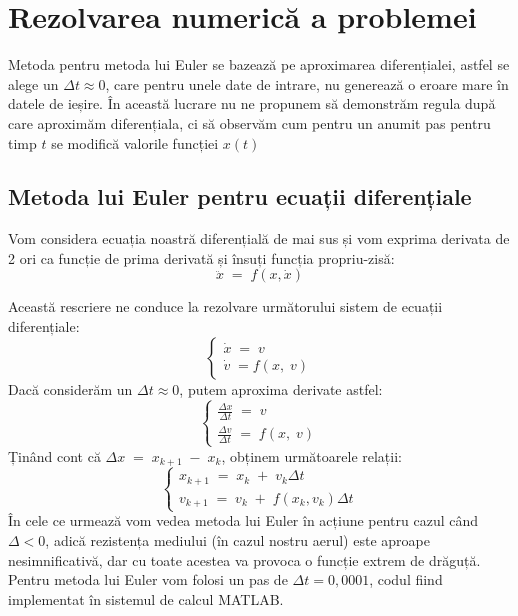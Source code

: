 \documentclass[12pt, a4paper]{article}
\begin{document}
\section{Rezolvarea numerică a problemei}
\hspace{0.4cm}Metoda pentru metoda lui Euler \cite{kaw10} se bazează pe aproximarea diferențialei, astfel se alege un $\Delta t \approx 0$, care pentru unele date de intrare, nu generează o eroare mare în datele de ieșire. În această lucrare nu ne propunem să demonstrăm regula după care aproximăm diferențiala, ci să observăm cum pentru un anumit pas pentru timp $t$ se modifică valorile funcției $x(t)$ 

\subsection{Metoda lui Euler pentru ecuații diferențiale}
Vom considera ecuația noastră diferențială de mai sus și vom exprima derivata de 2 ori ca funcție de prima derivată și însuți funcția propriu-zisă:
$$\ddot{x}\;=\;f(x,\dot{x})$$

Această rescriere ne conduce la rezolvare următorului sistem de ecuații diferențiale:
\begin{equation}\nonumber
    \left\{
        \begin{array}{lr}
            \dot{x}\;=\;v\\[10pt]
            \dot{v}\;= f(x,\;v)
        \end{array}
    \right.
\end{equation}
\hspace{0.6cm}Dacă considerăm un $\Delta t \approx 0$, putem aproxima derivate astfel:
\begin{equation}\nonumber
        \left\{
        \begin{array}{lr}
            \frac{\Delta x}{\Delta t}\;=\;v\\[10pt]
            \frac{\Delta v}{\Delta t}\;=\;f(x,\;v)
        \end{array}
        \right.
    \end{equation}
\hspace{0.6cm}Ținând cont că $\Delta x\;=\;x_{k+1}\;-\;x_{k}$, obținem următoarele relații:
\begin{equation}\nonumber
        \left\{
        \begin{array}{lr}
            x_{k+1}\;=\;x_k\;+\;v_k\Delta t\\[10pt]
            v_{k+1}\;=\;v_k\;+\;f(x_k, v_k)\Delta t
        \end{array}
        \right.
    \end{equation}
\hspace{0.6cm}În cele ce urmează vom vedea metoda lui Euler în acțiune pentru cazul când $\Delta < 0$, adică rezistența mediului (în cazul nostru aerul) este aproape nesimnificativă, dar cu toate acestea va provoca o funcție extrem de drăguță. Pentru metoda lui Euler vom folosi un pas de $\Delta t = 0,0001$, codul fiind implementat în sistemul de calcul MATLAB.
\newpage
\end{document}
